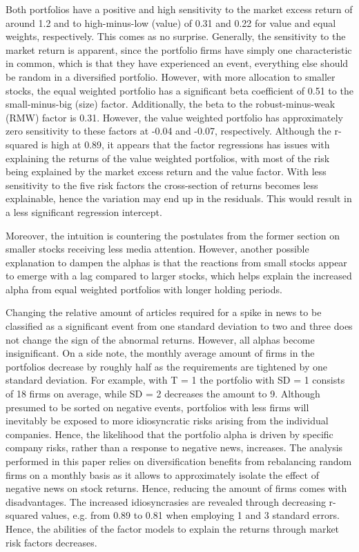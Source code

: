 Both portfolios have a positive and high sensitivity to the market excess return of around 1.2 and to high-minus-low (value) of 0.31 and 0.22 for value and equal weights, respectively. This comes as no surprise. Generally, the sensitivity to the market return is apparent, since the portfolio firms have simply one characteristic in common, which is that they have experienced an event, everything else should be random in a diversified portfolio. However, with more allocation to smaller stocks, the equal weighted portfolio has a significant beta coefficient of 0.51 to the small-minus-big (size) factor. Additionally, the beta to the robust-minus-weak (RMW) factor is 0.31. However, the value weighted portfolio has approximately zero sensitivity to these factors at -0.04 and -0.07, respectively. Although the r-squared is high at 0.89, it appears that the factor regressions has issues with explaining the returns of the value weighted portfolios, with most of the risk being explained by the market excess return and the value factor. With less sensitivity to the five risk factors the cross-section of returns becomes less explainable, hence the variation may end up in the residuals. This would result in a less significant regression intercept.  

Moreover, the intuition is countering the postulates from the former section on smaller stocks receiving less media attention. However, another possible explanation to dampen the alphas is that the reactions from small stocks appear to emerge with a lag compared to larger stocks, which helps explain the increased alpha from equal weighted portfolios with longer holding periods. 


Changing the relative amount of articles required for a spike in news to be classified as a significant event from one standard deviation to two and three does not change the sign of the abnormal returns. However, all alphas become insignificant. On a side note, the monthly average amount of firms in the portfolios decrease by roughly half as the requirements are tightened by one standard deviation. For example, with T = 1 the portfolio with SD = 1 consists of 18 firms on average, while SD = 2 decreases the amount to 9. Although presumed to be sorted on negative events, portfolios with less firms will inevitably be exposed to more idiosyncratic risks arising from the individual companies. Hence, the likelihood that the portfolio alpha is driven by specific company risks, rather than a response to negative news, increases. The analysis performed in this paper relies on diversification benefits from rebalancing random firms on a monthly basis as it allows to approximately isolate the effect of negative news on stock returns. Hence, reducing the amount of firms comes with disadvantages. The increased idiosyncrasies are revealed through decreasing r-squared values, e.g. from 0.89 to 0.81 when employing 1 and 3 standard errors. Hence, the abilities of the factor models to explain the returns through market risk factors decreases. 

